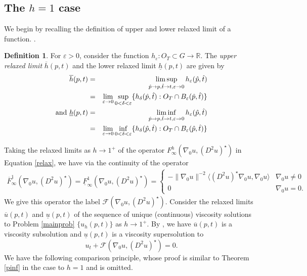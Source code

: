 \documentclass[12pt]{amsart}
\theoremstyle{definition}
\newtheorem{definition}{Definition}
\theoremstyle{remark}
\numberwithin{equation}{section}
\begin{document}
\subsection{The $h=1$ case}
We begin by recalling the definition of upper and lower relaxed limit of a function. \cite{CIL:UGTVS, Giga}. 
\begin{definition}
For $\varepsilon>0$, consider the function $h_\varepsilon:O_T\subset G\to\mathbb{R}$. The \emph{upper relaxed limit} $\overline{h}(p,t)$ and the lower relaxed limit $\underline{h}(p,t)$ are given by 
\begin{eqnarray*}
\overline{h}(p,t) & = & \limsup_{\hat{p}\to p,\hat{t}\to t, \varepsilon\to 0} h_\varepsilon(\hat{p}, \hat{t}) \\
 & = & \lim_{\varepsilon\to 0} \sup_{0<\delta<\varepsilon}\{h_\delta(\hat{p},\hat{t}): O_T\cap B_\varepsilon(\hat{p},\hat{t})\} \\
\textmd{and\ } \underline{h}(p,t) & = & \liminf_{\hat{p}\to p,\hat{t}\to t, \varepsilon\to 0} h_\varepsilon(\hat{p}, \hat{t}) \\
 & = & \lim_{\varepsilon\to 0} \inf_{0<\delta<\varepsilon}\{h_\delta(\hat{p},\hat{t}): O_T\cap B_\varepsilon(\hat{p},\hat{t})\} \\
\end{eqnarray*}
\end{definition}
Taking the relaxed limits as $h\to 1^+$ of the operator $F^h_\infty(\nabla_0 u,(D^2u)^{\star})$ in Equation \ref{relax}, we have via the continuity of the operator
\begin{eqnarray*}
\overline{F}^1_\infty(\nabla_0 u,(D^2u)^{\star}) = \underline{F}^1_\infty(\nabla_0 u,(D^2u)^{\star})=
\left\{\begin{array}{cl}
-\|\nabla_0u\|^{-2}{\ensuremath{\langle {(D^2u)^{\star}\nabla_0u} , {\nabla_0u} \rangle}} & \nabla_0u \neq 0 \\
0 & \nabla_0u = 0. \end{array}\right.
\end{eqnarray*}
We give this operator the label $\mathcal{F}(\nabla_0 u,(D^2u)^{\star})$. 
Consider the relaxed limits $\overline{u}(p,t)$ and $\underline{u}(p,t)$ of the sequence of unique (continuous) viscosity solutions to Problem \ref{mainprob} $\{u_h(p,t)\}$ as $h\to 1^+$. By  \cite[Thm 2.2.1]{Giga}, we have $\overline{u}(p,t)$ is a viscosity subsolution and $\underline{u}(p,t)$ is a viscosity supersolution to 
$$u_t+\mathcal{F}(\nabla_0 u,(D^2u)^{\star})=0.$$
We have the following comparison principle, whose proof is similar to Theorem \ref{pinf} in the case to $h=1$ and is omitted. 
\end{document}
